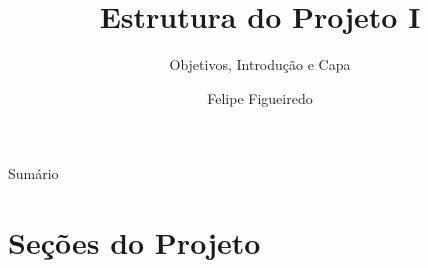 \documentclass{beamer}
\title%
{Estrutura do Projeto I}
\subtitle
{Objetivos, Introdução e Capa} %
\author%
{Felipe Figueiredo}%
\institute[INTO] %
{Instituto Nacional de Traumatologia e Ortopedia
}
\date%
{}
\begin{document}
\begin{frame}
  \titlepage
\end{frame}

\begin{frame}{Sumário}
  \tableofcontents
\end{frame}








\section{Seções do Projeto}
\end{document}
